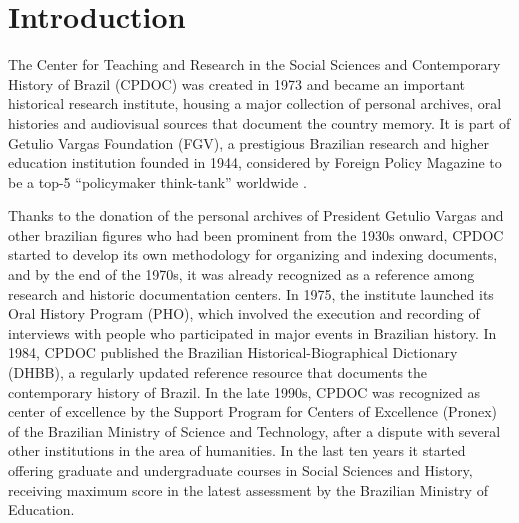 \section{Introduction}\label{sec:intro}

%

The Center for Teaching and Research in the Social Sciences and
Contemporary History of Brazil (CPDOC) was created in 1973 and became
an important historical research institute, housing a major collection
of personal archives, oral histories and audiovisual sources that
document the country memory. It is part of Getulio Vargas Foundation
(FGV), a prestigious Brazilian research and higher education
institution founded in 1944, considered by Foreign Policy Magazine to
be a top-5 ``policymaker think-tank'' worldwide \cite{think-tank}.

Thanks to the donation of the personal archives of President Getulio
Vargas and other brazilian figures who had been prominent from the
1930s onward, CPDOC started to develop its own methodology for
organizing and indexing documents, and by the end of the 1970s, it was
already recognized as a reference among research and historic
documentation centers. In 1975, the institute launched its Oral
History Program (PHO), which involved the execution and recording of
interviews with people who participated in major events in Brazilian
history. In 1984, CPDOC published the Brazilian
Historical-Biographical Dictionary (DHBB), a regularly updated
reference resource that documents the contemporary history of
Brazil. In the late 1990s, CPDOC was recognized as center of
excellence by the Support Program for Centers of Excellence (Pronex)
of the Brazilian Ministry of Science and Technology, after a dispute
with several other institutions in the area of humanities. In the last
ten years it started offering graduate and undergraduate courses in
Social Sciences and History, receiving maximum score in the latest
assessment by the Brazilian Ministry of Education.

